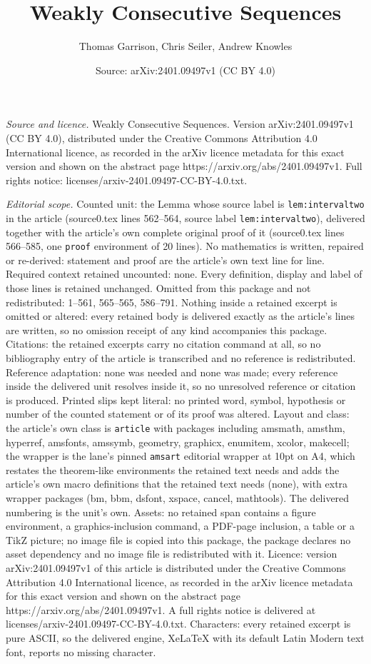 \documentclass[10pt,a4paper]{amsart}
\title[Weakly Consecutive Sequences]{Weakly Consecutive Sequences}
\author{Thomas Garrison, Chris Seiler, Andrew Knowles}
\date{Source: arXiv:2401.09497v1 (CC BY 4.0)}
\begin{document}
\maketitle

\noindent\emph{Source and licence.} Weakly Consecutive Sequences. Version arXiv:2401.09497v1 (CC BY 4.0), distributed under the Creative Commons Attribution 4.0 International licence, as recorded in the arXiv licence metadata for this exact version and shown on the abstract page https://arxiv.org/abs/2401.09497v1. Full rights notice: licenses/arxiv-2401.09497-CC-BY-4.0.txt.\par\smallskip

\noindent\textit{Editorial scope.} Counted unit: the Lemma whose source label is \texttt{lem:intervaltwo} in the article (source0.tex lines 562--564, source label \texttt{lem:intervaltwo}), delivered together with the article's own complete original proof of it (source0.tex lines 566--585, one \texttt{proof} environment of 20 lines). No mathematics is written, repaired or re-derived: statement and proof are the article's own text line for line. Required context retained uncounted: none. Every definition, display and label of those lines is retained unchanged. Omitted from this package and not redistributed: 1--561, 565--565, 586--791. Nothing inside a retained excerpt is omitted or altered: every retained body is delivered exactly as the article's lines are written, so no omission receipt of any kind accompanies this package. Citations: the retained excerpts carry no citation command at all, so no bibliography entry of the article is transcribed and no reference is redistributed. Reference adaptation: none was needed and none was made; every reference inside the delivered unit resolves inside it, so no unresolved reference or citation is produced. Printed slips kept literal: no printed word, symbol, hypothesis or number of the counted statement or of its proof was altered. Layout and class: the article's own class is \texttt{article} with packages including amsmath, amsthm, hyperref, amsfonts, amssymb, geometry, graphicx, enumitem, xcolor, makecell; the wrapper is the lane's pinned \texttt{amsart} editorial wrapper at 10pt on A4, which restates the theorem-like environments the retained text needs and adds the article's own macro definitions that the retained text needs (none), with extra wrapper packages (bm, bbm, dsfont, xspace, cancel, mathtools). The delivered numbering is the unit's own. Assets: no retained span contains a figure environment, a graphics-inclusion command, a PDF-page inclusion, a table or a TikZ picture; no image file is copied into this package, the package declares no asset dependency and no image file is redistributed with it. Licence: version arXiv:2401.09497v1 of this article is distributed under the Creative Commons Attribution 4.0 International licence, as recorded in the arXiv licence metadata for this exact version and shown on the abstract page https://arxiv.org/abs/2401.09497v1. A full rights notice is delivered at licenses/arxiv-2401.09497-CC-BY-4.0.txt. Characters: every retained excerpt is pure ASCII, so the delivered engine, XeLaTeX with its default Latin Modern text font, reports no missing character.
\end{document}
